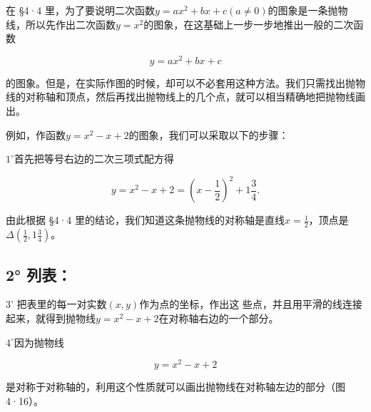 在 §4·4
里，为了要说明二次函数\(y = ax^2 + bx + c (a \neq 0)\)的图象是一条抛物线，所以先作出二次函数\(y = x^2\)的图象，在这基础上一步一步地推出一般的二次函数

\[
y = a x^{2} + b x + c
\]

的图象。但是，在实际作图的时候，却可以不必套用这种方法。我们只需找出抛物线的对称轴和顶点，然后再找出抛物线上的几个点，就可以相当精确地把抛物线画出。

例如，作函数\(y = x^2 - x + 2\)的图象，我们可以采取以下的步骤：

\(1^{\circ}\)首先把等号右边的二次三项式配方得

\[
y = x^{2} - x + 2 = \left(x - \frac{1}{2}\right)^{2} + 1 \frac{3}{4}.
\]

由此根据 §4·4
里的结论，我们知道这条抛物线的对称轴是直线\(x = \frac{1}{2}\)，顶点是\(\Delta\left(\frac{1}{2}, 1\frac{3}{4}\right)\)。

\subsection{2° 列表：}

{\centering
\small\setlength{\tabcolsep}{3pt}%
\par
}

3' 把表里的每一对实数\((x, y)\)作为点的坐标，作出这
些点，并且用平滑的线连接起来，就得到抛物线\(y = x^{2} - x + 2\)在对称轴右边的一个部分。

\(4^{\circ}\)因为抛物线

\[
y = x^{2} - x + 2
\]

是对称于对称轴的，利用这个性质就可以画出抛物线在对称轴左边的部分（图4·16）。

